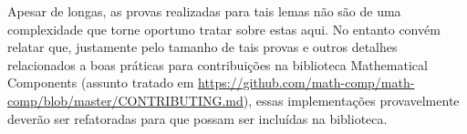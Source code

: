         Apesar de longas, as provas realizadas para tais lemas não são de uma complexidade que torne oportuno tratar sobre estas aqui. No entanto convém relatar que, justamente pelo tamanho de tais provas e outros detalhes relacionados a boas práticas para contribuições na biblioteca Mathematical Components (assunto tratado em \url{https://github.com/math-comp/math-comp/blob/master/CONTRIBUTING.md}), essas implementações provavelmente deverão ser refatoradas para que possam ser incluídas na biblioteca.


